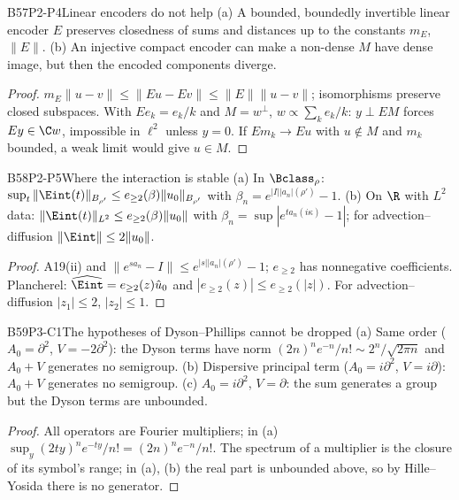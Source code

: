 \begin{dimcard}{B57}{P2-P4}{Linear encoders do not help}{\proved}{}
(a) A bounded, boundedly invertible linear encoder $E$ preserves closedness of sums and distances up to the constants $m_E$, $\|E\|$. (b) An injective compact encoder can make a non-dense $M$ have dense image, but then the encoded components diverge.
\end{dimcard}
\begin{proof}
$m_E\|u-v\|\le\|Eu-Ev\|\le\|E\|\|u-v\|$; isomorphisms preserve closed subspaces.
With $Ee_k=e_k/k$ and $M=w^\perp$, $w\propto\sum_ke_k/k$: $y\perp EM$ forces $Ey\in\C w$, impossible in $\ell^2$ unless $y=0$. If $Em_k\to Eu$ with $u\notin M$ and $m_k$ bounded, a weak limit would give $u\in M$.
\end{proof}

\begin{dimcard}{B58}{P2-P5}{Where the interaction is stable}{\proved}{}
(a) In $\Bclass_\rho$: $\sup_t\|\Eint(t)\|_{B_{\rho'}}\le e_{\ge2}(\beta)\|u_0\|_{B_{\rho'}}$ with $\beta_n=e^{|I||a_n|(\rho')}-1$. (b) On $\R$ with $L^2$ data: $\|\Eint(t)\|_{L^2}\le e_{\ge2}(\beta)\|u_0\|$ with $\beta_n=\sup|e^{ta_n(i\kappa)}-1|$; for advection--diffusion $\|\Eint\|\le2\|u_0\|$.
\end{dimcard}
\begin{proof}
A19(ii) and $\|e^{sa_n}-I\|\le e^{|s||a_n|(\rho')}-1$; $e_{\ge2}$ has nonnegative coefficients.
Plancherel: $\widehat{\Eint}=e_{\ge2}(z)\hat u_0$ and $|e_{\ge2}(z)|\le e_{\ge2}(|z|)$. For advection--diffusion $|z_1|\le2$, $|z_2|\le1$.
\end{proof}

\begin{dimcard}{B59}{P3-C1}{The hypotheses of Dyson--Phillips cannot be dropped}{\proved}{}
(a) Same order ($A_0=\partial^2$, $V=-2\partial^2$): the Dyson terms have norm $(2n)^ne^{-n}/n!\sim2^n/\sqrt{2\pi n}$ and $A_0+V$ generates no semigroup. (b) Dispersive principal term ($A_0=i\partial^2$, $V=i\partial$): $A_0+V$ generates no semigroup. (c) $A_0=i\partial^2$, $V=\partial$: the sum generates a group but the Dyson terms are unbounded.
\end{dimcard}
\begin{proof}
All operators are Fourier multipliers; in (a) $\sup_y(2ty)^ne^{-ty}/n!=(2n)^ne^{-n}/n!$.
The spectrum of a multiplier is the closure of its symbol's range; in (a), (b) the real part is unbounded above, so by Hille--Yosida there is no generator.
\end{proof}

